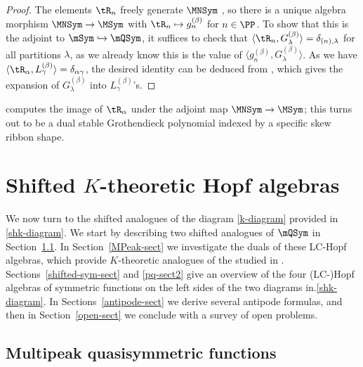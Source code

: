 \begin{proof}
The elements $\tR_{n}$
 freely generate $\MNSym$ \cite[Prop.~8.3]{LamPyl},
 so there is a unique algebra morphism $\MNSym \to \MSym$
 with $\tR_n \mapsto g^{(\beta)}_{n} $ for $n \in \PP$. 
To show that this is the adjoint to $\mSym \hookrightarrow \mQSym$,
it suffices to check that $\langle \tR_{n}, G^{(\beta)}_\lambda \rangle= \delta_{(n),\lambda}$ for all partitions $\lambda$,
as we already know this is the value of $\langle g^{(\beta)}_{n}, G^{(\beta)}_\lambda \rangle $.
As we have $ \langle \tR_{\alpha}, L^{(\beta)}_{\gamma} \rangle = \delta_{\alpha\gamma}$, the desired identity can be deduced from \cite[Eq.\ (3.10)]{LM2019},
which gives the expansion of $G^{(\beta)}_\lambda$ into $L^{(\beta)}_\gamma$'s.
\end{proof}


 \cite[Thm.~9.13]{LamPyl} computes the 
 image of $\tR_\alpha$ 
 under the adjoint map $\MNSym \to \MSym$;
 this  turns out to be a dual stable Grothendieck polynomial indexed by a specific skew ribbon shape.


 





 




 




 

\section{Shifted \texorpdfstring{$K$}{K}-theoretic Hopf algebras}\label{main-sect}

We now turn to the shifted analogues of the diagram \eqref{k-diagram} provided in \eqref{shk-diagram}.
%
We start by 
describing two shifted analogues of $\mQSym$
in Section~\ref{multipeak-sect}.
In Section~\ref{MPeak-sect} we investigate the duals of these LC-Hopf algebras, which provide
$K$-theoretic analogues of the  studied in \cite{Nyman,Schocker}.
Sections~\ref{shifted-sym-sect} and \ref{pq-sect2} 
give an overview of the four (LC-)Hopf algebras of symmetric functions
on the left sides of the two diagrams in.\eqref{shk-diagram}.
In Sections~\ref{antipode-sect} 
we derive several antipode formulas, and then in
Section~\ref{open-sect} we conclude with a survey of open problems.



\subsection{Multipeak quasisymmetric functions}\label{multipeak-sect}

